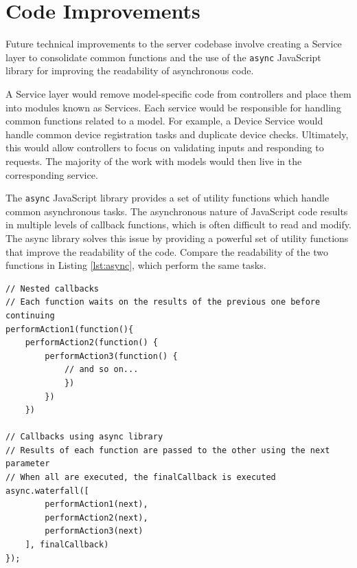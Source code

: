 \section{Code Improvements}

Future technical improvements to the server codebase involve creating a Service layer to consolidate common functions and the use of the \texttt{async} JavaScript library for improving the readability of asynchronous code. 

A Service layer would remove model-specific code from controllers and place them into modules known as Services. Each service would be responsible for handling common functions related to a model. For example, a Device Service would handle common device registration tasks and duplicate device checks. Ultimately, this would allow controllers to focus on validating inputs and responding to requests. The majority of the work with models would then live in the corresponding service.

The \texttt{async} JavaScript library provides a set of utility functions which handle common asynchronous tasks. The asynchronous nature of JavaScript code results in multiple levels of callback functions, which is often difficult to read and modify. The async library solves this issue by providing a powerful set of utility functions that improve the readability of the code. Compare the readability of the two functions in Listing \ref{lst:async}, which perform the same tasks. 

\medskip
\begin{lstlisting}[caption={[Typical Nested Code vs \texttt{async} library]Comparison between normal callback code and \texttt{async} code}, label={lst:async}]
// Nested callbacks
// Each function waits on the results of the previous one before continuing
performAction1(function(){
	performAction2(function() {
		performAction3(function() {
			// and so on...
			})
		})
	})

// Callbacks using async library
// Results of each function are passed to the other using the next parameter
// When all are executed, the finalCallback is executed
async.waterfall([
		performAction1(next), 
		performAction2(next),
		performAction3(next)
	], finalCallback)
});
\end{lstlisting}









